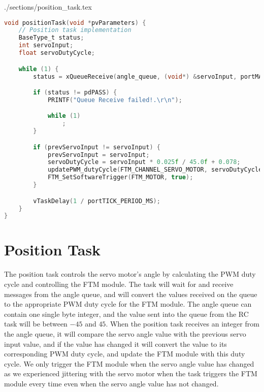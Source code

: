 \begin{filecontents}[overwrite]{./sections/position_task.tex}
\begin{lstlisting}[language=c,caption=Position Task, label=list:position]
void positionTask(void *pvParameters) {
    // Position task implementation
    BaseType_t status;
    int servoInput;
    float servoDutyCycle;

    while (1) {
        status = xQueueReceive(angle_queue, (void*) &servoInput, portMAX_DELAY);

        if (status != pdPASS) {
            PRINTF("Queue Receive failed!.\r\n");

            while (1)
                ;
        }

        if (prevServoInput != servoInput) {
            prevServoInput = servoInput;
            servoDutyCycle = servoInput * 0.025f / 45.0f + 0.078;
            updatePWM_dutyCycle(FTM_CHANNEL_SERVO_MOTOR, servoDutyCycle);
            FTM_SetSoftwareTrigger(FTM_MOTOR, true);
        }

        vTaskDelay(1 / portTICK_PERIOD_MS);
    }
}
\end{lstlisting}
\end{filecontents}

\section*{Position Task}

The position task controls the servo motor's angle by calculating the PWM duty cycle and controlling the FTM module. The task will wait for and receive messages from the angle queue, and will convert the values received on the queue to the appropriate PWM duty cycle for the FTM module. The angle queue can contain one single byte integer, and the value sent into the queue from the RC task will be between $-45$ and $45$. When the position task receives an integer from the angle queue, it will compare the servo angle value with the previous servo input value, and if the value has changed it will convert the value to its corresponding PWM duty cycle, and update the FTM module with this duty cycle. We only trigger the FTM module when the servo angle value has changed as we experienced jittering with the servo motor when the task triggers the FTM module every time even when the servo angle value has not changed.

